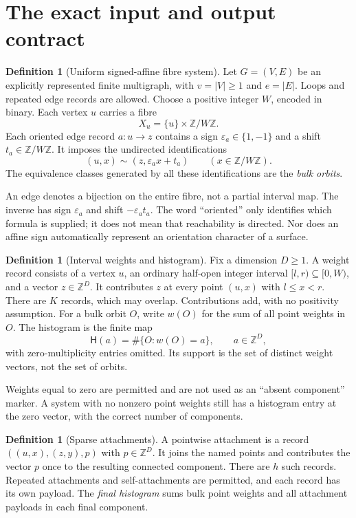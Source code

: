\documentclass[11pt]{article}
\theoremstyle{definition}
\newtheorem{definition}[theorem]{Definition}
\newcommand{\Z}{\mathbb Z}
\newcommand{\hist}{\mathsf H}
\newcommand{\eps}{\varepsilon}
\begin{document}
\section{The exact input and output contract}
\label{sec:model}

\begin{definition}[Uniform signed-affine fibre system]
Let $G=(V,E)$ be an explicitly represented finite multigraph, with $v=|V|\ge1$ and $e=|E|$. Loops and repeated edge records are allowed. Choose a positive integer $W$, encoded in binary. Each vertex $u$ carries a fibre
\[
 X_u=\{u\}\times\Z/W\Z.
\]
Each oriented edge record $a:u\to z$ contains a sign $\eps_a\in\{1,-1\}$ and a shift $t_a\in\Z/W\Z$. It imposes the undirected identifications
\begin{equation}
 (u,x)\sim(z,\eps_a x+t_a) \qquad(x\in\Z/W\Z).
 \label{eq:edge}
\end{equation}
The equivalence classes generated by all these identifications are the \emph{bulk orbits}.
\end{definition}

An edge denotes a bijection on the entire fibre, not a partial interval map. The inverse has sign $\eps_a$ and shift $-\eps_at_a$. The word ``oriented'' only identifies which formula is supplied; it does not mean that reachability is directed. Nor does an affine sign automatically represent an orientation character of a surface.

\begin{definition}[Interval weights and histogram]
Fix a dimension $D\ge1$. A weight record consists of a vertex $u$, an ordinary half-open integer interval $[l,r)\subseteq[0,W)$, and a vector $z\in\Z^D$. It contributes $z$ at every point $(u,x)$ with $l\le x<r$. There are $K$ records, which may overlap. Contributions add, with no positivity assumption. For a bulk orbit $O$, write $w(O)$ for the sum of all point weights in $O$.
The histogram is the finite map
\[
 \hist(a)=\#\{O:w(O)=a\},\qquad a\in\Z^D,
\]
with zero-multiplicity entries omitted. Its support is the set of distinct weight vectors, not the set of orbits.
\end{definition}

Weights equal to zero are permitted and are not used as an ``absent component'' marker. A system with no nonzero point weights still has a histogram entry at the zero vector, with the correct number of components.

\begin{definition}[Sparse attachments]
A pointwise attachment is a record $((u,x),(z,y),p)$ with $p\in\Z^D$. It joins the named points and contributes the vector $p$ once to the resulting connected component. There are $h$ such records. Repeated attachments and self-attachments are permitted, and each record has its own payload. The \emph{final histogram} sums bulk point weights and all attachment payloads in each final component.
\end{definition}
\end{document}
